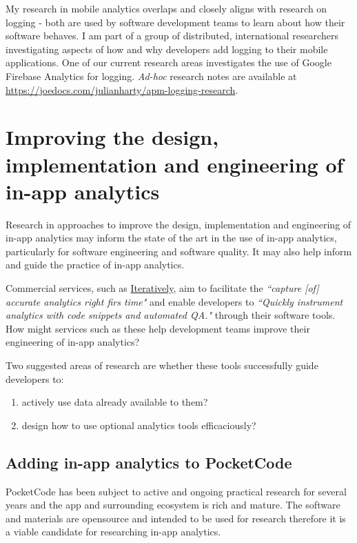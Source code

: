 My research in mobile analytics overlaps and closely aligns with research on logging - both are used by software development teams to learn about how their software behaves. I am part of a group of distributed, international researchers investigating aspects of how and why developers add logging to their mobile applications. One of our current research areas investigates the use of Google Firebase Analytics for logging. \emph{Ad-hoc} research notes are available at \url{https://joedocs.com/julianharty/apm-logging-research}.


\section{Improving the design, implementation and engineering of in-app analytics}
Research in approaches to improve the design, implementation and engineering of in-app analytics may inform the state of the art in the use of in-app analytics, particularly for software engineering and software quality. It may also help inform and guide the practice of in-app analytics. 

Commercial services, such as \href{http://iterative.ly}{Iteratively}, aim to facilitate the \emph{``capture [of] accurate analytics right firs time"} and enable developers to \emph{``Quickly instrument analytics with code snippets and automated QA."} through their software tools. How might services such as these help development teams improve their engineering of in-app analytics? 

Two suggested areas of research are whether these tools successfully guide developers to:
\begingroup
\renewcommand{\theenumi}{\alph{enumi}}
\begin{enumerate}
    \item actively use data already available to them?
    \item design how to use optional analytics tools efficaciously?
\end{enumerate}
\endgroup


\subsection{Adding in-app analytics to PocketCode}
PocketCode has been subject to active and ongoing practical research for several years and the app and surrounding ecosystem is rich and mature. The software and materials are opensource and intended to be used for research therefore it is a viable candidate for researching in-app analytics.

